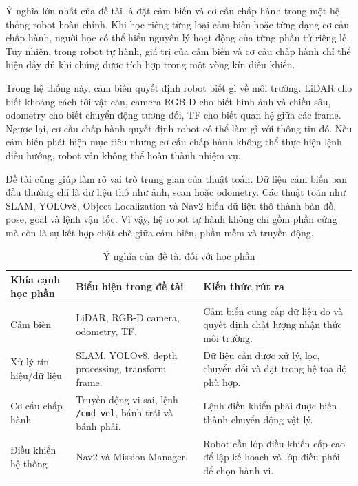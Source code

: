 Ý nghĩa lớn nhất của đề tài là đặt cảm biến và cơ cấu chấp hành trong một hệ thống robot hoàn chỉnh. Khi học riêng từng loại cảm biến hoặc từng dạng cơ cấu chấp hành, người học có thể hiểu nguyên lý hoạt động của từng phần tử riêng lẻ. Tuy nhiên, trong robot tự hành, giá trị của cảm biến và cơ cấu chấp hành chỉ thể hiện đầy đủ khi chúng được tích hợp trong một vòng kín điều khiển.

Trong hệ thống này, cảm biến quyết định robot biết gì về môi trường. LiDAR cho biết khoảng cách tới vật cản, camera RGB-D cho biết hình ảnh và chiều sâu, odometry cho biết chuyển động tương đối, TF cho biết quan hệ giữa các frame. Ngược lại, cơ cấu chấp hành quyết định robot có thể làm gì với thông tin đó. Nếu cảm biến phát hiện mục tiêu nhưng cơ cấu chấp hành không thể thực hiện lệnh điều hướng, robot vẫn không thể hoàn thành nhiệm vụ.

Đề tài cũng giúp làm rõ vai trò trung gian của thuật toán. Dữ liệu cảm biến ban đầu thường chỉ là dữ liệu thô như ảnh, scan hoặc odometry. Các thuật toán như SLAM, YOLOv8, Object Localization và Nav2 biến dữ liệu thô thành bản đồ, pose, goal và lệnh vận tốc. Vì vậy, hệ robot tự hành không chỉ gồm phần cứng mà còn là sự kết hợp chặt chẽ giữa cảm biến, phần mềm và truyền động.

\begin{table}[H]
    \centering
    \caption{Ý nghĩa của đề tài đối với học phần}
    \label{tab:course-relevance}
    \renewcommand{\arraystretch}{1.25}
    \small
    \begin{tabularx}{\textwidth}{|>{\raggedright\arraybackslash}p{}|>{\raggedright\arraybackslash}p{}|>{\raggedright\arraybackslash}X|}
        \hline
        \textbf{Khía cạnh học phần} & \textbf{Biểu hiện trong đề tài} & \textbf{Kiến thức rút ra} \\
        \hline
        Cảm biến & LiDAR, RGB-D camera, odometry, TF. & Cảm biến cung cấp dữ liệu đo và quyết định chất lượng nhận thức môi trường. \\
        \hline
        Xử lý tín hiệu/dữ liệu & SLAM, YOLOv8, depth processing, transform frame. & Dữ liệu cần được xử lý, lọc, chuyển đổi và đặt trong hệ tọa độ phù hợp. \\
        \hline
        Cơ cấu chấp hành & Truyền động vi sai, lệnh \texttt{/cmd\_vel}, bánh trái và bánh phải. & Lệnh điều khiển phải được biến thành chuyển động vật lý. \\
        \hline
        Điều khiển hệ thống & Nav2 và Mission Manager. & Robot cần lớp điều khiển cấp cao để lập kế hoạch và lớp điều phối để chọn hành vi. \\
        \hline
    \end{tabularx}
\end{table}

